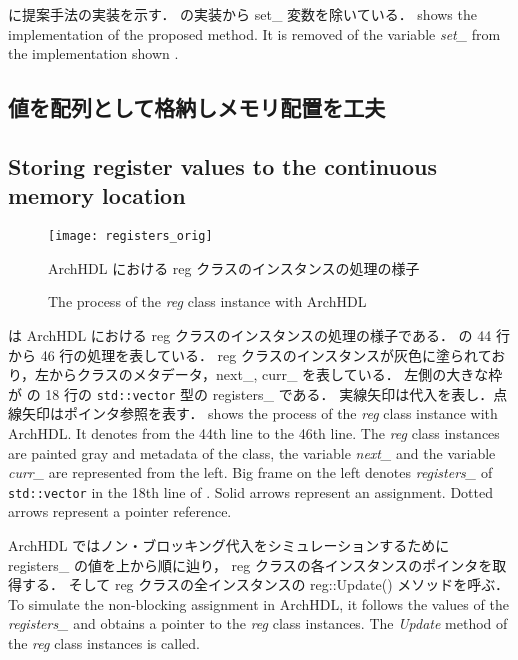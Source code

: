  に提案手法の実装を示す．
 の実装から set\_ 変数を除いている．
\fi
{} shows the implementation of the proposed method.
It is removed of the variable \textit{set\_} from the implementation shown .



\subsection{値を配列として格納しメモリ配置を工夫} \label{sss:mem_copy}
\fi
\subsection{Storing register values to the continuous memory location} \label{sss:mem_copy}

\begin{figure}[t]
 \centering
 \texttt{[image: registers\_orig]}
 \caption{ArchHDL における reg クラスのインスタンスの処理の様子}
\fi
 \caption{The process of the \textit{reg} class instance with ArchHDL}
 \label{fig:regs}
\end{figure}

 は ArchHDL における reg クラスのインスタンスの処理の様子である．
 の 44 行から 46 行の処理を表している．
reg クラスのインスタンスが灰色に塗られており，左からクラスのメタデータ，next\_, curr\_ を表している．
左側の大きな枠が の 18 行の \verb`std::vector` 型の registers\_ である．
実線矢印は代入を表し．点線矢印はポインタ参照を表す．
\fi
{} shows the process of the \textit{reg} class instance with ArchHDL.
It denotes  from the 44th line to the 46th line.
The \textit{reg} class instances are painted gray
and metadata of the class, the variable \textit{next\_} and the variable \textit{curr\_} are represented from the left.
Big frame on the left denotes \textit{registers\_} of \verb`std::vector` in the 18th line of .
Solid arrows represent an assignment.
Dotted arrows represent a pointer reference.

ArchHDL ではノン・ブロッキング代入をシミュレーションするために registers\_ の値を上から順に辿り，
reg クラスの各インスタンスのポインタを取得する．
そして reg クラスの全インスタンスの reg::Update() メソッドを呼ぶ．
\fi
To simulate the non-blocking assignment in ArchHDL,
it follows the values of the \textit{registers\_}
and obtains a pointer to the \textit{reg} class instances.
The \textit{Update} method of the \textit{reg} class instances is called.

